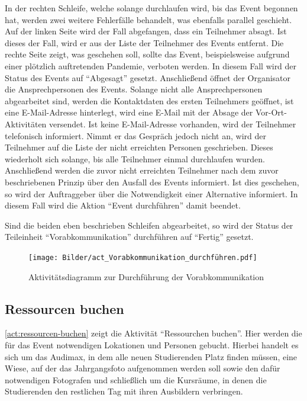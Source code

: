 In der rechten Schleife, welche solange durchlaufen wird, bis das Event begonnen hat, werden zwei weitere Fehlerfälle behandelt, was ebenfalls parallel geschieht. Auf der linken Seite wird der Fall abgefangen, dass ein Teilnehmer absagt. Ist dieses der Fall, wird er aus der Liste der Teilnehmer des Events entfernt. Die rechte Seite zeigt, was geschehen soll, sollte das Event, beispielsweise aufgrund einer plötzlich auftretenden Pandemie, verboten werden. In diesem Fall wird der Status des Events auf \enquote{Abgesagt} gesetzt. Anschließend öffnet der Organisator die Ansprechpersonen des Events. Solange nicht alle Ansprechpersonen abgearbeitet sind, werden die Kontaktdaten des ersten Teilnehmers geöffnet, ist eine E-Mail-Adresse hinterlegt, wird eine E-Mail mit der Absage der Vor-Ort-Aktivitäten versendet. Ist keine E-Mail-Adresse vorhanden, wird der Teilnehmer telefonisch informiert. Nimmt er das Gespräch jedoch nicht an, wird der Teilnehmer auf die Liste der nicht erreichten Personen geschrieben. Dieses wiederholt sich solange, bis alle Teilnehmer einmal durchlaufen wurden. Anschließend werden die zuvor nicht erreichten Teilnehmer nach dem zuvor beschriebenen Prinzip über den Ausfall des Events informiert. Ist dies geschehen, so wird der Auftraggeber über die Notwendigkeit einer Alternative informiert. In diesem Fall wird die Aktion \enquote{Event durchführen} damit beendet.

Sind die beiden eben beschrieben Schleifen abgearbeitet, so wird der Status der Teileinheit \enquote{Vorabkommunikation} durchführen auf \enquote{Fertig} gesetzt.
\begin{figure}[ht!]
    \centering
    \texttt{[image: Bilder/act\_Vorabkommunikation\_durchführen.pdf]}
    \caption{Aktivitätsdiagramm zur Durchführung der Vorabkommunikation}
    \label{act:vorabkomm-durchführen}
\end{figure}

\FloatBarrier

\subsection{Ressourcen buchen}
\autoref{act:ressourcen-buchen} zeigt die Aktivität \enquote{Ressourchen buchen}. Hier werden die für das Event notwendigen Lokationen und Personen gebucht. Hierbei handelt es sich um das Audimax, in dem alle neuen Studierenden Platz finden müssen, eine Wiese, auf der das Jahrgangsfoto aufgenommen werden soll sowie den dafür notwendigen Fotografen und schließlich um die Kursräume, in denen die Studierenden den restlichen Tag mit ihren Ausbildern verbringen.

